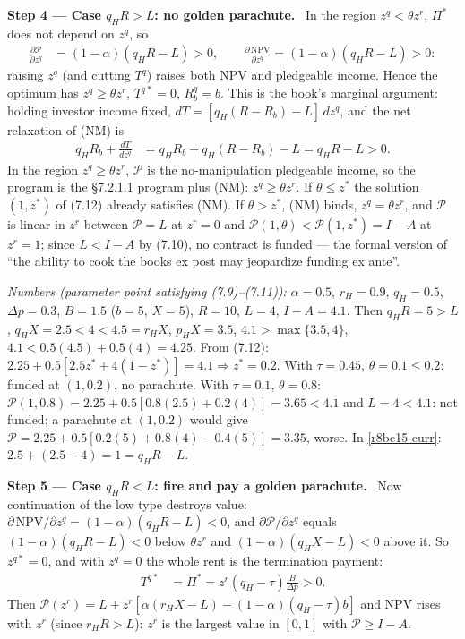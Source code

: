 \documentclass[11pt,a4paper]{article}
\newcommand{\step}[2]{\par\medskip\noindent\textbf{Step #1 --- #2.}~}
\newcommand{\dpp}{\Delta p}
\begin{document}
\step{4}{Case $q_HR>L$: no golden parachute} In the region $z^q<\theta z^r$, $\Pi^*$ does not depend on $z^q$, so
\begin{align}
  \frac{\partial\mathcal P}{\partial z^q} &= (1-\alpha)(q_HR-L) > 0, \qquad \frac{\partial\,\mathrm{NPV}}{\partial z^q} = (1-\alpha)(q_HR-L) > 0: \label{r8be15-c1}
\end{align}
raising $z^q$ (and cutting $T^q$) raises both NPV and pledgeable income. Hence the optimum has $z^q\ge\theta z^r$, $T^{q*}=0$, $R_b^q=b$. This is the book's marginal argument: holding investor income fixed, $dT=[q_H(R-R_b)-L]\,dz^q$, and the net relaxation of (NM) is
\begin{align}
  q_HR_b + \frac{dT}{dz^q} &= q_HR_b + q_H(R-R_b) - L = q_HR - L > 0. \label{r8be15-curr}
\end{align}
In the region $z^q\ge\theta z^r$, $\mathcal P$ is the no-manipulation pledgeable income, so the program is the \S7.2.1.1 program plus (NM): $z^q\ge\theta z^r$. If $\theta\le z^*$ the solution $(1,z^*)$ of (7.12) already satisfies (NM). If $\theta>z^*$, (NM) binds, $z^q=\theta z^r$, and $\mathcal P$ is linear in $z^r$ between $\mathcal P=L$ at $z^r=0$ and $\mathcal P(1,\theta)<\mathcal P(1,z^*)=I-A$ at $z^r=1$; since $L<I-A$ by (7.10), no contract is funded --- the formal version of ``the ability to cook the books ex post may jeopardize funding ex ante''.

\emph{Numbers (parameter point satisfying (7.9)--(7.11)):} $\alpha=0.5$, $r_H=0.9$, $q_H=0.5$, $\dpp=0.3$, $B=1.5$ ($b=5$, $X=5$), $R=10$, $L=4$, $I-A=4.1$. Then $q_HR=5>L$, $q_HX=2.5<4<4.5=r_HX$, $p_HX=3.5$, $4.1>\max\{3.5,4\}$, $4.1<0.5(4.5)+0.5(4)=4.25$. From (7.12): $2.25+0.5[2.5z^*+4(1-z^*)]=4.1\Rightarrow z^*=0.2$. With $\tau=0.45$, $\theta=0.1\le0.2$: funded at $(1,0.2)$, no parachute. With $\tau=0.1$, $\theta=0.8$: $\mathcal P(1,0.8)=2.25+0.5[0.8(2.5)+0.2(4)]=3.65<4.1$ and $L=4<4.1$: not funded; a parachute at $(1,0.2)$ would give $\mathcal P=2.25+0.5[0.2(5)+0.8(4)-0.4(5)]=3.35$, worse. In \eqref{r8be15-curr}: $2.5+(2.5-4)=1=q_HR-L$.

\step{5}{Case $q_HR<L$: fire and pay a golden parachute} Now continuation of the low type destroys value: $\partial\,\mathrm{NPV}/\partial z^q=(1-\alpha)(q_HR-L)<0$, and $\partial\mathcal P/\partial z^q$ equals $(1-\alpha)(q_HR-L)<0$ below $\theta z^r$ and $(1-\alpha)(q_HX-L)<0$ above it. So $z^{q*}=0$, and with $z^q=0$ the whole rent is the termination payment:
\begin{align}
  T^{q*} &= \Pi^* = z^r(q_H-\tau)\frac{B}{\dpp} > 0. \label{r8be15-T}
\end{align}
Then $\mathcal P(z^r)=L+z^r[\alpha(r_HX-L)-(1-\alpha)(q_H-\tau)b]$ and NPV rises with $z^r$ (since $r_HR>L$): $z^r$ is the largest value in $[0,1]$ with $\mathcal P\ge I-A$.
\end{document}
